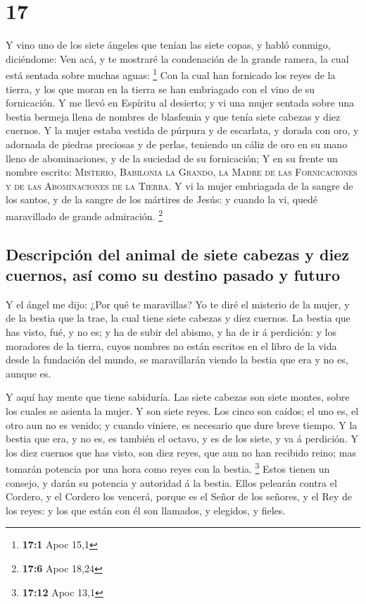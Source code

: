 \hypertarget{section-16}{%
\section{17}\label{section-16}}

 Y vino uno de los siete ángeles que tenían las siete
copas, y habló conmigo, diciéndome: Ven acá, y te mostraré la
condenación de la grande ramera, la cual está sentada sobre muchas
aguas: \footnote{\textbf{17:1} Apoc 15,1}  Con la cual han
fornicado los reyes de la tierra, y los que moran en la tierra se han
embriagado con el vino de su fornicación.  Y me llevó en
Espíritu al desierto; y vi una mujer sentada sobre una bestia bermeja
llena de nombres de blasfemia y que tenía siete cabezas y diez cuernos.
 Y la mujer estaba vestida de púrpura y de escarlata, y
dorada con oro, y adornada de piedras preciosas y de perlas, teniendo un
cáliz de oro en su mano lleno de abominaciones, y de la suciedad de su
fornicación;  Y en su frente un nombre escrito:
\textsc{Misterio, Babilonia la Grando, la Madre de las Fornicaciones y
de las Abominaciones de la Tierra}.  Y vi la mujer
embriagada de la sangre de los santos, y de la sangre de los mártires de
Jesús: y cuando la vi, quedé maravillado de grande admiración.
\footnote{\textbf{17:6} Apoc 18,24}

\hypertarget{descripciuxf3n-del-animal-de-siete-cabezas-y-diez-cuernos-asuxed-como-su-destino-pasado-y-futuro}{%
\subsection{Descripción del animal de siete cabezas y diez cuernos, así
como su destino pasado y
futuro}\label{descripciuxf3n-del-animal-de-siete-cabezas-y-diez-cuernos-asuxed-como-su-destino-pasado-y-futuro}}

 Y el ángel me dijo: ¿Por qué te maravillas? Yo te diré el
misterio de la mujer, y de la bestia que la trae, la cual tiene siete
cabezas y diez cuernos.  La bestia que has visto, fué, y
no es; y ha de subir del abismo, y ha de ir á perdición: y los moradores
de la tierra, cuyos nombres no están escritos en el libro de la vida
desde la fundación del mundo, se maravillarán viendo la bestia que era y
no es, aunque es.

 Y aquí hay mente que tiene sabiduría. Las siete cabezas
son siete montes, sobre los cuales se asienta la mujer. 
Y son siete reyes. Los cinco son caídos; el uno es, el otro aun no es
venido; y cuando viniere, es necesario que dure breve tiempo.
 Y la bestia que era, y no es, es también el octavo, y es
de los siete, y va á perdición.  Y los diez cuernos que
has visto, son diez reyes, que aun no han recibido reino; mas tomarán
potencia por una hora como reyes con la bestia. \footnote{\textbf{17:12}
  Apoc 13,1}  Estos tienen un consejo, y darán su
potencia y autoridad á la bestia.  Ellos pelearán contra
el Cordero, y el Cordero los vencerá, porque es el Señor de los señores,
y el Rey de los reyes: y los que están con él son llamados, y elegidos,
y fieles.

